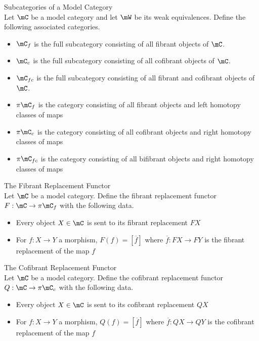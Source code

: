 \documentclass[a4paper]{article}
\begin{document}
\begin{defn}{Subcategories of a Model Category}{}\\ Let $\mC$ be a model category and let $\mW$ be its weak equivalences. Define the following associated categories. 
\begin{itemize}
\item $\mC_f$ is the full subcategory consisting of all fibrant objects of $\mC$. 
\item $\mC_c$ is the full subcategory consisting of all cofibrant objects of $\mC$. 
\item $\mC_{fc}$ is the full subcategory consisting of all fibrant and cofibrant objects of $\mC$. 
\item $\pi\mC_f$ is the category consisting of all fibrant objects and left homotopy classes of maps
\item $\pi\mC_c$ is the category consisting of all cofibrant objects and right homotopy classes of maps
\item $\pi\mC_{fc}$ is the category consisting of all bifibrant objects and right homotopy classes of maps
\end{itemize}
\end{defn}

\begin{defn}{The Fibrant Replacement Functor}{}\\ Let $\mC$ be a model category. Define the fibrant replacement functor $F:\mC\to\pi\mC_f$ with the following data. 
\begin{itemize}
\item Every object $X\in\mC$ is sent to its fibrant replacement $FX$
\item For $f:X\to Y$ a morphism, $F(f)=[\overline{f}]$ where $\overline{f}:FX\to FY$ is the fibrant replacement of the map $f$
\end{itemize}
\end{defn}

\begin{defn}{The Cofibrant Replacement Functor}{}\\ Let $\mC$ be a model category. Define the cofibrant replacement functor $Q:\mC\to\pi\mC_c$ with the following data. 
\begin{itemize}
\item Every object $X\in\mC$ is sent to its cofibrant replacement $QX$
\item For $f:X\to Y$ a morphism, $Q(f)=[\overline{f}]$ where $\overline{f}:QX\to QY$ is the cofibrant replacement of the map $f$
\end{itemize}
\end{defn}
\end{document}
